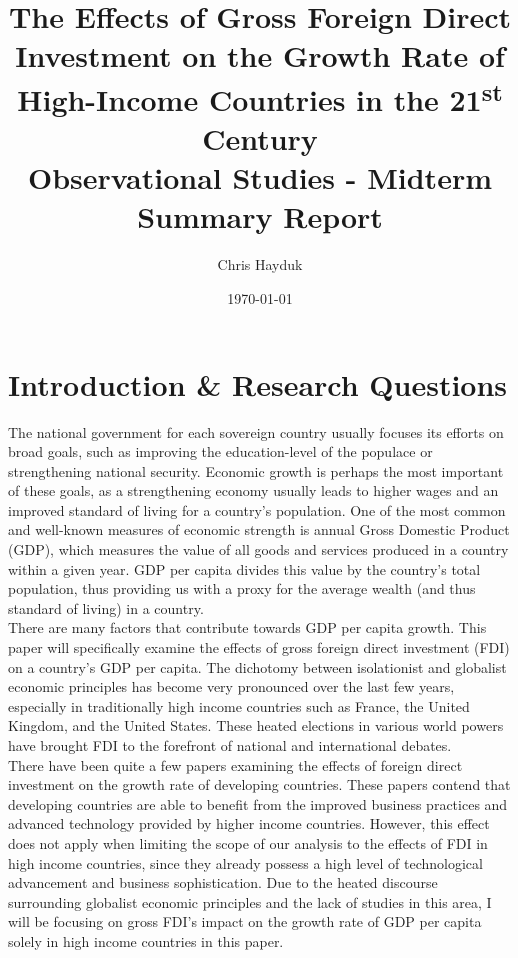 \documentclass{article}
\title{The Effects of Gross Foreign Direct Investment on the Growth Rate of High-Income Countries in the 21\textsuperscript{st} Century\\
\large Observational Studies - Midterm Summary Report}
\author{Chris Hayduk}
\date{\today}
\begin{document}

\doublespacing

\maketitle

\section{Introduction \& Research Questions}
\quad The national government for each sovereign country usually focuses its efforts on broad goals, such as improving the education-level of the populace or strengthening national security. Economic growth is perhaps the most important of these goals, as a strengthening economy usually leads to higher wages and an improved standard of living for a country's population. One of the most common and well-known measures of economic strength is annual Gross Domestic Product (GDP), which measures the value of all goods and services produced in a country within a given year. GDP per capita divides this value by the country's total population, thus providing us with a proxy for the average wealth (and thus standard of living) in a country.\\
\null\quad There are many factors that contribute towards GDP per capita growth. This paper will specifically examine the effects of gross foreign direct investment (FDI) on a country's GDP per capita. The dichotomy between isolationist and globalist economic principles has become very pronounced over the last few years, especially in traditionally high income countries such as France, the United Kingdom, and the United States. These heated elections in various world powers have brought FDI to the forefront of national and international debates.\\
\null\quad There have been quite a few papers examining the effects of foreign direct investment on the growth rate of developing countries. These papers contend that developing countries are able to benefit from the improved business practices and advanced technology provided by higher income countries. However, this effect does not apply when limiting the scope of our analysis to the effects of FDI in high income countries, since they already possess a high level of technological advancement and business sophistication. Due to the heated discourse surrounding globalist economic principles and the lack of studies in this area, I will be focusing on gross FDI's impact on the growth rate of GDP per capita solely in high income countries in this paper.
\end{document}
